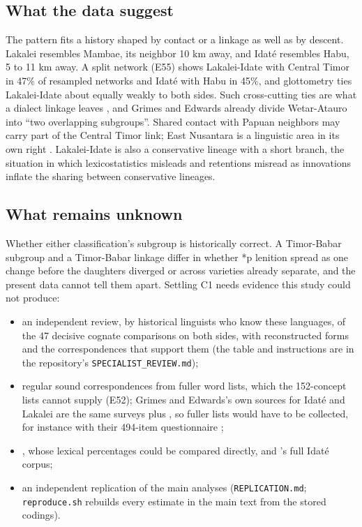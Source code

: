 \documentclass[11pt]{article}
\begin{document}
\subsection{What the data suggest}

The pattern fits a history shaped by contact or a linkage as well as by descent. Lakalei resembles Mambae, its neighbor 10 km away, and Idaté resembles Habu, 5 to 11 km away. A split network (E55) shows Lakalei-Idate with Central Timor in 47\% of resampled networks and Idaté with Habu in 45\%, and glottometry ties Lakalei-Idate about equally weakly to both sides. Such cross-cutting ties are what a dialect linkage leaves \citep{ross1988,francois2014}, and Grimes and Edwards already divide Wetar-Atauro into ``two overlapping subgroups''. Shared contact with Papuan neighbors may carry part of the Central Timor link; East Nusantara is a linguistic area in its own right \citep{klamer2008}. Lakalei-Idate is also a conservative lineage with a short branch, the situation in which lexicostatistics misleads \citep{blust2000} and retentions misread as innovations inflate the sharing between conservative lineages.

\subsection{What remains unknown}

Whether either classification's subgroup is historically correct. A Timor-Babar subgroup and a Timor-Babar linkage differ in whether *p lenition spread as one change before the daughters diverged or across varieties already separate, and the present data cannot tell them apart. Settling C1 needs evidence this study could not produce:

\begin{itemize}
\item an independent review, by historical linguists who know these languages, of the 47 decisive cognate comparisons on both sides, with reconstructed forms and the correspondences that support them (the table and instructions are in the repository's \texttt{SPECIALIST\_REVIEW.md});
\item regular sound correspondences from fuller word lists, which the 152-concept lists cannot supply (E52); Grimes and Edwards's own sources for Idaté and Lakalei are the same surveys plus \citet{ferreira2005}, so fuller lists would have to be collected, for instance with their 494-item questionnaire \citep[Appendix~D]{grimes2026};
\item \citet{hull1998}, whose lexical percentages could be compared directly, and \citeauthor{alcantara2015}'s \citeyearpar{alcantara2015} full Idaté corpus;
\item an independent replication of the main analyses (\texttt{REPLICATION.md}; \texttt{reproduce.sh} rebuilds every estimate in the main text from the stored codings).
\end{itemize}
\end{document}
